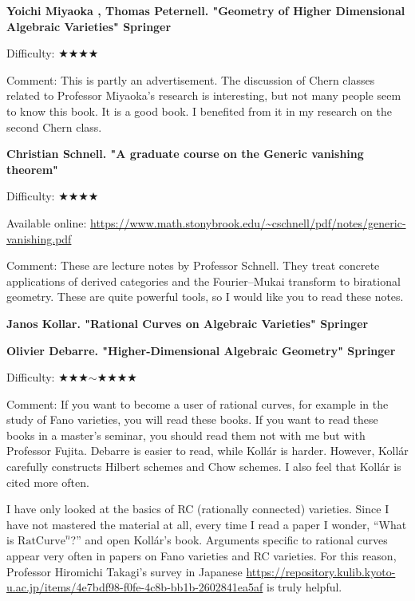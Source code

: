 \textbf{Yoichi Miyaoka , Thomas Peternell. "Geometry of Higher Dimensional Algebraic Varieties" Springer} \vspace{-6pt}

Difficulty: ★★★★\vspace{-6pt} 

Comment: This is partly an advertisement. The discussion of Chern classes related to Professor Miyaoka's research is interesting, but not many people seem to know this book. It is a good book. I benefited from it in my research on the second Chern class.

\textbf{Christian Schnell. "A graduate course on the Generic vanishing theorem" }  \vspace{-6pt} 

Difficulty: ★★★★\vspace{-6pt} 

Available online: \url{https://www.math.stonybrook.edu/~cschnell/pdf/notes/generic-vanishing.pdf} \vspace{-6pt} 

Comment: These are lecture notes by Professor Schnell. They treat concrete applications of derived categories and the Fourier--Mukai transform to birational geometry. These are quite powerful tools, so I would like you to read these notes.
\vspace{8pt}

\textbf{Janos Kollar. "Rational Curves on Algebraic Varieties" Springer} \vspace{-6pt}

\textbf{Olivier Debarre. "Higher-Dimensional Algebraic Geometry" Springer} \vspace{-6pt}

Difficulty: ★★★$\sim$★★★★\vspace{-6pt} 

Comment: If you want to become a user of rational curves, for example in the study of Fano varieties, you will read these books. If you want to read these books in a master's seminar, you should read them not with me but with Professor Fujita. Debarre is easier to read, while Koll\'ar is harder. However, Koll\'ar carefully constructs Hilbert schemes and Chow schemes. I also feel that Koll\'ar is cited more often.

I have only looked at the basics of RC (rationally connected) varieties. Since I have not mastered the material at all, every time I read a paper I wonder, ``What is $\mathrm{RatCurve}^{n}$?'' and open Koll\'ar's book. Arguments specific to rational curves appear very often in papers on Fano varieties and RC varieties. For this reason, Professor Hiromichi Takagi's survey in Japanese \url{https://repository.kulib.kyoto-u.ac.jp/items/4e7bdf98-f0fe-4c8b-bb1b-2602841ea5af} is truly helpful.
 \vspace{8pt}
 
